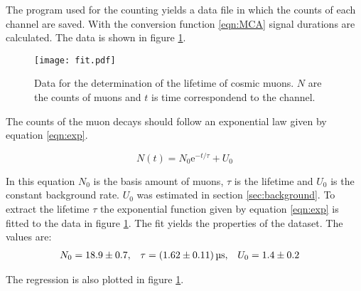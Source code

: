 The program used for the counting yields a data file in which the counts of each channel are saved. With the conversion function \ref{eqn:MCA} signal durations are calculated. The data 
is shown in figure \ref{fig:lifetime}.

\begin{figure}
    \centering
    \texttt{[image: fit.pdf]}
    \caption{Data for the determination of the lifetime of cosmic muons. $N$ are the counts of muons and $t$ is time correspondend to the channel.}
    \label{fig:lifetime}
\end{figure}

The counts of the muon decays should follow an exponential law given by equation \ref{eqn:exp}. 

\begin{equation}
    \label{eqn:exp}
    N(t) = N_0 \mathrm{e}^{-t/\tau} + U_0
\end{equation}

In this equation $N_0$ is the basis amount of muons, $\tau$ is the lifetime and $U_0$ is the constant background rate. $U_0$ was estimated in section \ref{sec:background}.
To extract the lifetime $\tau$ the exponential function given by equation \ref{eqn:exp} is fitted to the data in figure \ref{fig:lifetime}.
The fit yields the properties of the dataset. The values are:
\begin{align*}
    N_0 &= \num{18.9 +- 0.7}, & \tau &= \qty{1.62 +- 0.11}{\micro\second}, & U_0 &= \num{1.4 +- 0.2}
\end{align*}

The regression is also plotted in figure \ref{fig:lifetime}.